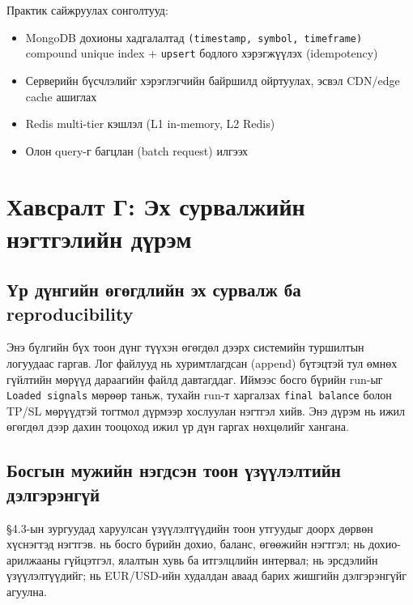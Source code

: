 Практик сайжруулах сонголтууд:
\begin{itemize}
    \item MongoDB дохионы хадгалалтад \texttt{(timestamp, symbol, timeframe)} compound unique index + \texttt{upsert} бодлого хэрэгжүүлэх (idempotency)
    \item Серверийн бүсчлэлийг хэрэглэгчийн байршилд ойртуулах, эсвэл CDN/edge cache ашиглах
    \item Redis multi-tier кэшлэл (L1 in-memory, L2 Redis)
    \item Олон query-г багцлан (batch request) илгээх
\end{itemize}

\section*{Хавсралт Г: Эх сурвалжийн нэгтгэлийн дүрэм}
\label{app:data_aggregation}
\renewcommand{\thetable}{Г.\arabic{table}}
\renewcommand{\thefigure}{Г.\arabic{figure}}
\setcounter{table}{0}
\setcounter{figure}{0}

\subsection*{Үр дүнгийн өгөгдлийн эх сурвалж ба reproducibility}

Энэ бүлгийн бүх тоон дүнг түүхэн өгөгдөл дээрх системийн туршилтын логуудаас гаргав. Лог файлууд нь хуримтлагдсан (append) бүтэцтэй тул өмнөх гүйлтийн мөрүүд дараагийн файлд давтагддаг. Иймээс босго бүрийн run-ыг \texttt{Loaded signals} мөрөөр таньж, тухайн run-т харгалзах \texttt{final balance} болон TP/SL мөрүүдтэй тогтмол дүрмээр хослуулан нэгтгэл хийв. Энэ дүрэм нь ижил өгөгдөл дээр дахин тооцоход ижил үр дүн гаргах нөхцөлийг хангана.

\subsection*{Босгын мужийн нэгдсэн тоон үзүүлэлтийн дэлгэрэнгүй}

§4.3-ын зургуудад харуулсан үзүүлэлтүүдийн тоон утгуудыг доорх дөрвөн хүснэгтэд нэгтгэв.  нь босго бүрийн дохио, баланс, өгөөжийн нэгтгэл;  нь дохио-арилжааны гүйцэтгэл, ялалтын хувь ба итгэлцлийн интервал;  нь эрсдэлийн үзүүлэлтүүдийг;  нь EUR/USD-ийн худалдан аваад барих жишгийн дэлгэрэнгүйг агуулна.

